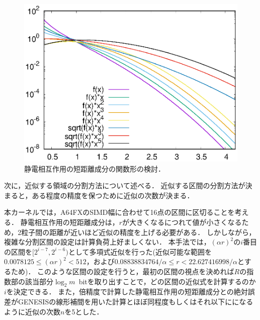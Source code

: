 \documentclass[uplatex,11pt,a4j,titlepage,oneside,openright,dvipdfmx]{jsbook}
\begin{document}
\begin{figure}
 \centering
 \includegraphics[width=12.0cm]{figure/func.eps}
 \caption[]{静電相互作用の短距離成分の関数形の検討．}
 \label{fig:func}
\end{figure}

次に，近似する領域の分割方法について述べる．
近似する区間の分割方法が決まると，ある程度の精度を保つために近似の次数が決まる．

本カーネルでは，A64FXのSIMD幅に合わせて16点の区間に区切ることを考える．
静電相互作用の短距離成分は，$r$が大きくなるにつれて値が小さくなるため，2粒子間の距離が近いほど近似の精度を上げる必要がある．
しかしながら，複雑な分割区間の設定は計算負荷上好ましくない．
本手法では，$(\alpha r)^2$の$i$番目の区間を$[2^{i-7}, 2^{i-6})$として多項式近似を行った(近似可能な範囲を$0.0078125 \leq (\alpha r)^2 < 512$，および$0.08838834764/\alpha \leq r < 22.627416998/\alpha$とするため)．
このような区間の設定を行うと，最初の区間の視点を決めれば$R$の指数部の該当部分\mbox{$\log_2 m$ bit}を取り出すことで，どの区間の近似式を計算するのか$i$を決定できる．
また，倍精度で計算した静電相互作用の短距離成分との絶対誤差がGENESISの線形補間を用いた計算とほぼ同程度もしくはそれ以下にになるように近似の次数$n$を5とした．
\end{document}
